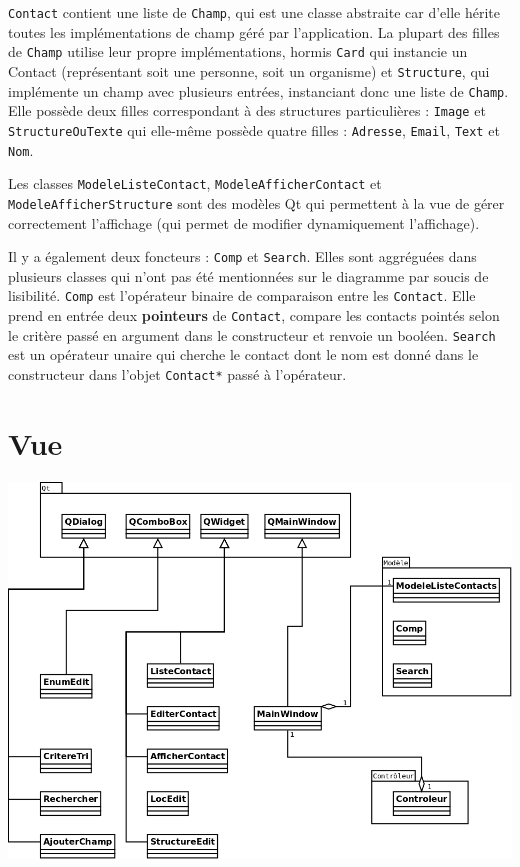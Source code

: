 \documentclass[a4paper,12pt]{report}
\begin{document}
\texttt{Contact} contient une liste de \texttt{Champ}, qui est une classe abstraite car d'elle hérite toutes les implémentations de champ géré par l'application.
La plupart des filles de \texttt{Champ} utilise leur propre implémentations, hormis \texttt{Card} qui instancie un Contact (représentant soit une personne, soit un organisme) et \texttt{Structure}, qui implémente un champ avec plusieurs entrées, instanciant donc une liste de \texttt{Champ}. Elle possède deux filles correspondant à des structures particulières : \texttt{Image} et \texttt{StructureOuTexte} qui elle-même possède quatre filles : \texttt{Adresse}, \texttt{Email}, \texttt{Text} et \texttt{Nom}.

Les classes \texttt{ModeleListeContact}, \texttt{ModeleAfficherContact} et \texttt{ModeleAfficherStructure} sont des modèles Qt qui permettent à la vue de gérer correctement l'affichage (qui permet de modifier dynamiquement l'affichage).

Il y a également deux foncteurs : \texttt{Comp} et \texttt{Search}. Elles sont aggréguées dans plusieurs classes qui n'ont pas été mentionnées sur le diagramme par soucis de lisibilité.
\texttt{Comp} est l'opérateur binaire de comparaison entre les \texttt{Contact}. Elle prend en entrée deux {\bf pointeurs} de \texttt{Contact}, compare les contacts pointés selon le critère passé en argument dans le constructeur et renvoie un booléen.
\texttt{Search} est un opérateur unaire qui cherche le contact dont le nom est donné dans le constructeur dans l'objet \texttt{Contact*} passé à l'opérateur.


\section{Vue}

\includegraphics[scale=0.35]{../dia/ClassDiagramView.png}
\end{document}
